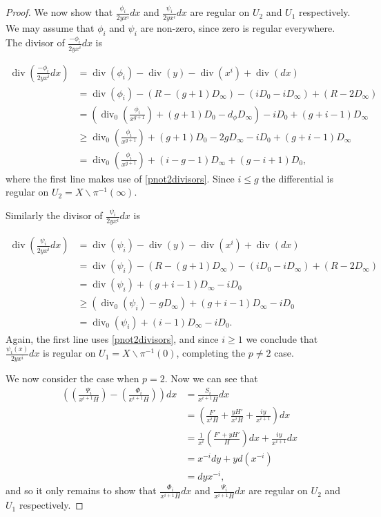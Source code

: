 \documentclass[draft, 11pt]{article} %
\theoremstyle{plain}
\theoremstyle{remark}
\DeclareMathOperator{\di}{div}
\begin{document}
\begin{proof}
We now show that $\frac{\phi_i}{2yx^i}dx$ and $\frac{\psi_i}{2yx^i}dx$ are regular on $U_2$ and $U_1$ respectively.
We may assume that $\phi_i$ and $\psi_i$ are non-zero, since zero is regular everywhere.
The divisor of $\frac{-\phi_i}{2yx^i}dx$ is

\begin{align*}
\di\left( \frac{-\phi_i}{2yx^i}dx \right) & =  \di(\phi_i) -\di(y) - \di(x^i) + \di (dx) \\
& =  \di(\phi_i) - ( R - (g+1)D_\infty) - (iD_0 - iD_\infty) + (R - 2D_\infty) \\
& =  \left( \di_0\left( \frac{\phi_i}{x^{g+1}}\right) + (g+1)D_0 - d_\phi D_\infty\right) - iD_0 + (g+i-1)D_\infty \\
& \geq  \di_0\left( \frac{\phi_i}{x^{g+1}}\right) + (g+1)D_0 - 2gD_\infty - iD_0 + (g+i-1)D_\infty \\
& =  \di_0\left( \frac{\phi_i}{x^{g+1}} \right) + (i-g-1)D_\infty + (g-i+1)D_0,
\end{align*}
where the first line makes use of \eqref{pnot2divisors}.
Since $i \leq g$ the differential is regular on $U_2 = X\backslash \pi^{-1}(\infty)$.

Similarly the divisor of $\frac{\psi_i}{2yx^i}dx$ is

\begin{align*}
\di \left( \frac{\psi_i}{2yx^i}dx\right) & =  \di(\psi_i) - \di(y) - \di(x^i) + \di (dx) \\
& =  \di (\psi_i ) -(R - (g+1)D_\infty) - (iD_0 - iD_\infty) + (R -2D_\infty) \\
& =  \di(\psi_i) + (g+i-1)D_\infty -iD_0 \\
& \geq \left( \di_0(\psi_i) - gD_\infty \right) + (g+i-1)D_\infty -iD_0 \\
& =  \di_0(\psi_i) + (i-1)D_\infty - iD_0.
\end{align*}
Again, the first line uses \eqref{pnot2divisors}, and since $i\geq 1$ we conclude that $\frac{\psi_i(x)}{2yx^i}dx$ is regular on $U_1 = X \backslash \pi^{-1}(0)$, completing the $p\neq 2$ case.


We now consider the case when $p=2$.
Now we can see that
\begin{align*}
\left( \left( \frac{ \Psi_i}{x^{i+1}H} \right) - \left( \frac{\Phi_i}{x^{i+1}H} \right) \right) dx & =  \frac{S_i}{x^{i+1}H}dx \\
& =  \left( \frac{F'}{x^iH} + \frac{yH'}{x^iH} + \frac{iy}{x^{i+1}} \right) dx \\
& =  \frac{1}{x^i}\left( \frac{F' + yH'}{H} \right) dx + \frac{iy}{x^{i+1}}dx \\
& =  x^{-i}dy + yd \left( x^{-i}\right) \\
& =  dyx^{-i},
\end{align*}
and so it only remains to show that $\frac{\Phi_i}{x^{i+1}H}dx$ and $\frac{\Psi_i}{x^{i+1}H}dx$ are regular on $U_2$ and $U_1$ respectively.



\end{proof}
\end{document}
